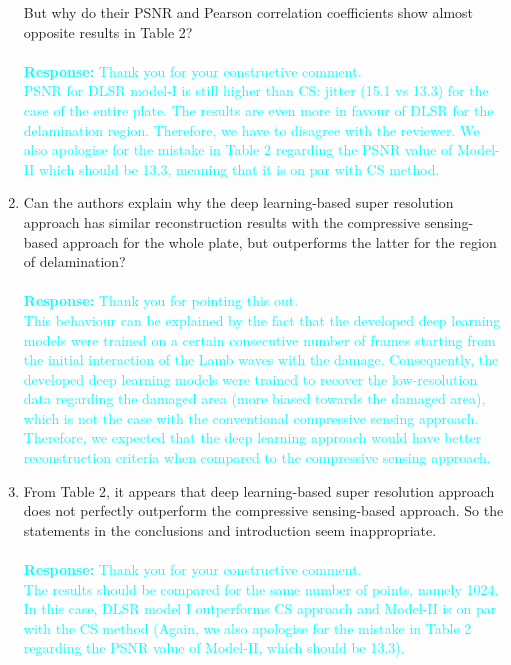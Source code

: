 \documentclass[11pt,a2paper]{report}
\begin{document}
\begin{enumerate}
		But why do their PSNR and Pearson correlation coefficients show almost opposite results in Table 2?
		\\ \\ 
		\textcolor{Cyan}
		{
			\textbf{Response:}
			Thank you for your constructive comment.\\
			PSNR for DLSR model-I is still higher than CS: jitter (15.1 vs 13.3) for the case of the entire plate. 
			The results are even more in favour of DLSR for the delamination region. 
			Therefore, we have to disagree with the reviewer.
			We also apologise for the mistake in Table 2 regarding the PSNR value of Model-II which should be 13.3, meaning that it is on par with CS method.
		}
		\item  Can the authors explain why the deep learning-based super resolution approach has similar reconstruction results with the compressive sensing-based approach for the whole plate, but outperforms the latter for the region of delamination?
		\\ \\ 
		\textcolor{Cyan}
		{
			\textbf{Response:}
			Thank you for pointing this out. \\
			This behaviour can be explained by the fact that the developed deep learning models were trained on a certain consecutive number of frames starting from the initial interaction of the Lamb waves with the damage. 
			Consequently, the developed deep learning models were trained to recover the low-resolution data regarding the damaged area (more biased towards the damaged area), which is not the case with the conventional compressive sensing approach.
			Therefore, we expected that the deep learning approach would have better reconstruction criteria when compared to the compressive sensing approach.	
		}
		\item From Table 2, it appears that deep learning-based super resolution approach does not perfectly outperform the compressive sensing-based approach. 
		So the statements in the conclusions and introduction seem inappropriate.
		\\ \\ 
		\textcolor{Cyan}
		{
			\textbf{Response:}
			Thank you for your constructive comment. \\
			The results should be compared for the same number of points, namely 1024. 
			In this case, DLSR model I outperforms CS approach and Model-II is on par with the CS method (Again, we also apologise for the mistake in Table 2 regarding the PSNR value of Model-II, which should be 13.3). 
}
\end{enumerate}
\end{document}
